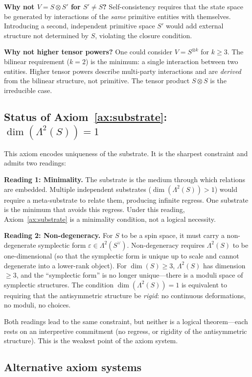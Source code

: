 \documentclass[11pt,a4paper]{article}
\theoremstyle{definition}
\theoremstyle{remark}
\begin{document}
\textbf{Why not $V=S\otimes S'$ for $S'\neq S$?}
Self-consistency requires that the state space be generated by
interactions of the \emph{same} primitive entities with themselves.
Introducing a second, independent primitive space $S'$ would add
external structure not determined by $S$, violating the closure
condition.

\textbf{Why not higher tensor powers?}
One could consider $V=S^{\otimes k}$ for $k\geq 3$.
The bilinear requirement ($k=2$) is the minimum: a single interaction
between two entities.
Higher tensor powers describe multi-party interactions and are
\emph{derived} from the bilinear structure, not primitive.
The tensor product $S\otimes S$ is the irreducible case.

\subsection{Status of Axiom~\ref{ax:substrate}: $\dim(\Lambda^2(S))=1$}

This axiom encodes uniqueness of the substrate.
It is the sharpest constraint and admits two readings:

\textbf{Reading 1: Minimality.}
The substrate is the medium through which relations are embedded.
Multiple independent substrates ($\dim(\Lambda^2(S))>1$) would require
a meta-substrate to relate them, producing infinite regress.
One substrate is the minimum that avoids this regress.
Under this reading, Axiom~\ref{ax:substrate} is a minimality condition,
not a logical necessity.

\textbf{Reading 2: Non-degeneracy.}
For $S$ to be a spin space, it must carry a non-degenerate symplectic
form $\varepsilon\in\Lambda^2(S^\vee)$.
Non-degeneracy requires $\Lambda^2(S)$ to be one-dimensional (so that
the symplectic form is unique up to scale and cannot degenerate into
a lower-rank object).
For $\dim(S)\geq 3$, $\Lambda^2(S)$ has dimension $\geq 3$, and the
``symplectic form'' is no longer unique---there is a moduli space of
symplectic structures.
The condition $\dim(\Lambda^2(S))=1$ is equivalent to requiring that the
antisymmetric structure be \emph{rigid}: no continuous deformations, no
moduli, no choices.

Both readings lead to the same constraint, but neither is a logical
theorem---each rests on an interpretive commitment (no regress, or
rigidity of the antisymmetric structure).
This is the weakest point of the axiom system.

\subsection{Alternative axiom systems}
\end{document}
